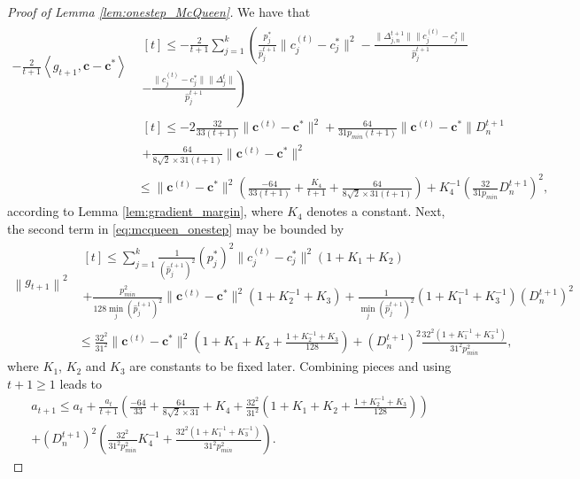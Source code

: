 \documentclass[noinfoline,preprint]{article}
\newcommand{\cb}{\mathbf{c}}
\renewcommand{\1}{\mathds 1}
\begin{document}
\begin{proof}[Proof of Lemma \ref{lem:onestep_McQueen}]
We have that
\begin{align*}
-  \frac{2}{t+1} \left\langle g_{t+1} , \cb-\cb^* \right\rangle & \begin{multlined}[t]
                                             \leq -\frac{2}{t+1} \sum_{j=1}^k \left ( \frac{p_j^*}{\hat{p}_j^{t+1}} \| c_j^{(t)} - c_j^*\|^2 - \frac{\| \Delta_{j,n}^{t+1} \| \| c_j^{(t)} - c_j^* \|}{\hat{p}_j^{t+1}} \right . \\
                                             - \left . \frac{\| c_j^{(t)}-c_j^*\|\| \Delta_j^{t}\|}{\hat{p}_j^{t+1}} \right )
\end{multlined} \\
  & \begin{multlined}[t] \leq -2 \frac{32}{33(t+1)} \| \cb^{(t)} - \cb^*\|^2 + \frac{64}{31p_{min}(t+1)} \| \cb^{(t)} - \cb^*\|D_n^{t+1} \\
   + \frac{64}{8\sqrt{2} \times 31 (t+1)} \| \cb^{(t)} -\cb^*\|^2
  \end{multlined} \\
   & \leq \|\cb^{(t)} - \cb^*\|^2 \left ( \frac{-64}{33(t+1)} + \frac{K_4}{t+1} + \frac{64}{8\sqrt{2} \times 31 (t+1)} \right ) +  K_4^{-1} \left ( \frac{32}{31 p_{min}} D_n^{t+1} \right )^2,
\end{align*}
according to Lemma \ref{lem:gradient_margin}, where $K_4$ denotes a constant. Next, the second term in \eqref{eq:mcqueen_onestep} may be bounded by
\begin{align*}
\left \| g_{t+1} \right \|^2 & \begin{multlined}[t] \leq  \sum_{j=1}^k \frac{1}{(\hat{p}_j^{t+1})^2} (p_j^*)^2 \|c_j^{(t)} - c_j^*\|^2 \left ( 1 + K_1 + K_2 \right ) \\
 + \frac{p_{min}^2}{128 \min_j{(\hat{p}_j^{t+1})^2}} \| \cb^{(t)} - \cb^*\|^2\left ( 1 + K_2^{-1} + K_3 \right ) +  \frac{1}{ \min_j{(\hat{p}_j^{t+1})^2}} \left ( 1 + K_1^{-1} + K_3^{-1} \right ) (D_n^{t+1})^2
\end{multlined} \\
 &\leq \frac{32^2}{31^2} \| \cb^{(t)} - \cb^* \|^2 \left ( 1 + K_1 + K_2 + \frac{1 + K_2^{-1} + K_3}{128} \right ) + (D_n^{t+1})^2 \frac{32^2(1 + K_1^{-1} + K_3^{-1})}{31^2 p_{min}^2}, 
\end{align*} 
where $K_1$, $K_2$ and $K_3$ are constants to be fixed later. Combining pieces and using $t+1 \geq 1$ leads to
\begin{multline*}
a_{t+1} \leq a_t + \frac{a_t}{t+1} \left( \frac{-64}{33} + \frac{64}{8\sqrt{2} \times 31} + K_4 +\frac{32^2}{31^2} \left ( 1 + K_1 + K_2 + \frac{1 + K_2^{-1} + K_3}{128} \right ) \right) \\ + \left(D_n^{t+1} \right )^2 \left (\frac{32^2}{31^2 p_{min}^2}K_4^{-1} + \frac{32^2(1 + K_1^{-1} + K_3^{-1})}{31^2 p_{min}^2} \right ).

\end{multline*}
\end{proof}
\end{document}
